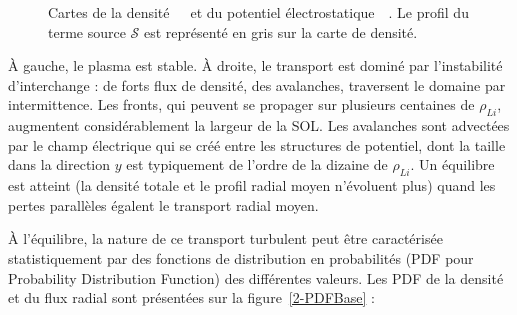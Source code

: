 \begin{refsection}
\begin{figure}[!htbp]
    \centering
    \caption{Cartes de la densité~~~et du potentiel
    électrostatique~~. Le profil du terme source
    $\mathcal{S}$ est représenté en gris sur la carte de densité.
    }
    \label{2-CartesBase}
\end{figure}

À gauche, le plasma est stable. À droite, le transport est dominé par l'instabilité d'interchange : de
forts flux de densité, des avalanches, traversent le domaine par intermittence.
Les fronts, qui peuvent se propager sur plusieurs centaines de
$\rho_{Li}$, augmentent considérablement la largeur de la SOL.
Les avalanches sont advectées par le champ électrique qui se créé entre les
structures de potentiel, dont la taille dans la direction $y$ est
typiquement de l'ordre de la dizaine de $\rho_{Li}$.
Un équilibre est atteint (la densité totale et le profil radial moyen
n'évoluent plus) quand les pertes parallèles égalent le transport radial moyen.

À l'équilibre, la nature de ce transport turbulent peut être
caractérisée statistiquement par des fonctions de distribution en probabilités
(PDF pour Probability Distribution Function) des différentes valeurs. Les PDF
de la densité et du flux radial sont présentées sur la figure~\ref{2-PDFBase} : 


\end{refsection}
